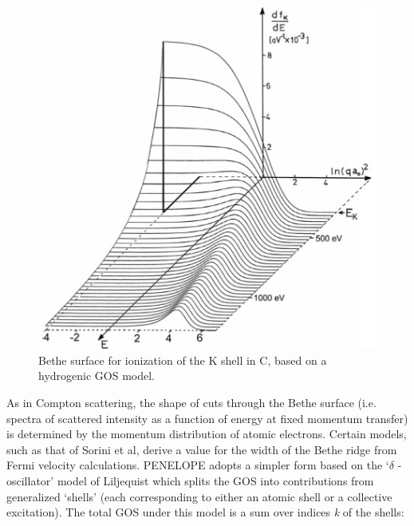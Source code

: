 \documentclass [11pt, proquest, article] {uwthesis}[2016/11/22]
\begin{document}
\begin{figure}[h] 
\caption{Bethe surface for ionization of the K shell in C, based on a hydrogenic GOS model.\cite{egerton1979k}}
\label{fig:bethe}
\centering
\includegraphics[scale=0.5]{../Figures/bethe.png}
\end{figure}

As in Compton scattering, the shape of cuts through the Bethe surface (i.e. spectra of scattered intensity as a function of energy at fixed momentum transfer) is determined by the momentum distribution of atomic electrons. Certain models, such as that of Sorini et al, derive a value for the width of the Bethe ridge from Fermi velocity calculations.\cite{sorini2006ab} PENELOPE adopts a simpler form based on the `$\delta$ -oscillator' model of Liljequist which splits the GOS into contributions from generalized `shells' (each corresponding to either an atomic shell or a collective excitation).\cite{liljequist1983simple} The total GOS under this model is a sum over indices \emph{k} of the shells:
\end{document}
